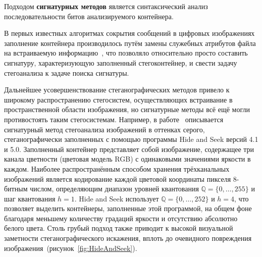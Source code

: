 Подходом \textbf{сигнатурных методов} является синтаксический анализ последовательности битов анализируемого контейнера.

В первых известных алгоритмах сокрытия сообщений в цифровых изображениях заполнение контейнера производилось путём замены служебных атрибутов файла на встраиваемую информацию~\cite{FridrichBook}, что позволяло относительно просто составить сигнатуру, характеризующую заполненный стегоконтейнер, и свести задачу стегоанализа к задаче поиска сигнатуры.

Дальнейшее усовершенствование стеганографических методов привело к широкому распространению стегосистем, осуществляющих встраивание в пространственной области изображения, но сигнатурные методы всё ещё могли противостоять таким стегосистемам. Например, в работе~\cite{HideAndSeek} описывается сигнатурный метод стегоанализа изображений в оттенках серого, стеганографически заполненных с помощью программы Hide and Seek версий 4.1 и 5.0. Заполненный контейнер представляет собой изображение, содержащее три канала цветности (цветовая модель RGB) с одинаковыми значениями яркости в каждом. Наиболее распространённым способом хранения трёхканальных изображений является кодирование каждой цветовой координаты пикселя 8-битным числом, определяющим диапазон уровней квантования $ \mathbb{Q} = \{0, \dotsc,255\} $ и шаг квантования $ h = 1 $. Hide and Seek использует $ \mathbb{Q} = \{0, \dotsc,252\} $ и $ h = 4 $, что позволяет выделить контейнеры, заполненные этой программой, на общем фоне благодаря меньшему количеству градаций яркости и отсутствию абсолютно белого цвета. Столь грубый подход также приводит к высокой визуальной заметности стеганографического искажения, вплоть до очевидного повреждения изображения~(рисунок~\ref{fig:HideAndSeek}).

